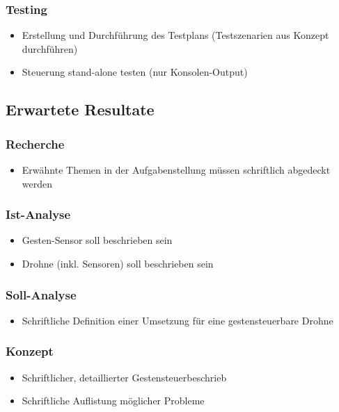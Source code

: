 \subsubsection{Testing}
\begin{itemize}
	\item Erstellung und Durchführung des Testplans (Testszenarien aus Konzept durchführen)
	\item Steuerung stand-alone testen (nur Konsolen-Output)
\end{itemize}

\subsection{Erwartete Resultate}
\subsubsection{Recherche}
\begin{itemize}
	\item Erwähnte Themen in der Aufgabenstellung müssen schriftlich abgedeckt werden
\end{itemize}

\subsubsection{Ist-Analyse}
\begin{itemize}
	\item Gesten-Sensor soll beschrieben sein
	\item Drohne (inkl. Sensoren) soll beschrieben sein
\end{itemize}

\subsubsection{Soll-Analyse}
\begin{itemize}
	\item Schriftliche Definition einer Umsetzung für eine gestensteuerbare Drohne
\end{itemize}

\subsubsection{Konzept}
\begin{itemize}
	\item Schriftlicher, detaillierter Gestensteuerbeschrieb
	\item Schriftliche Auflistung möglicher Probleme
\end{itemize}

